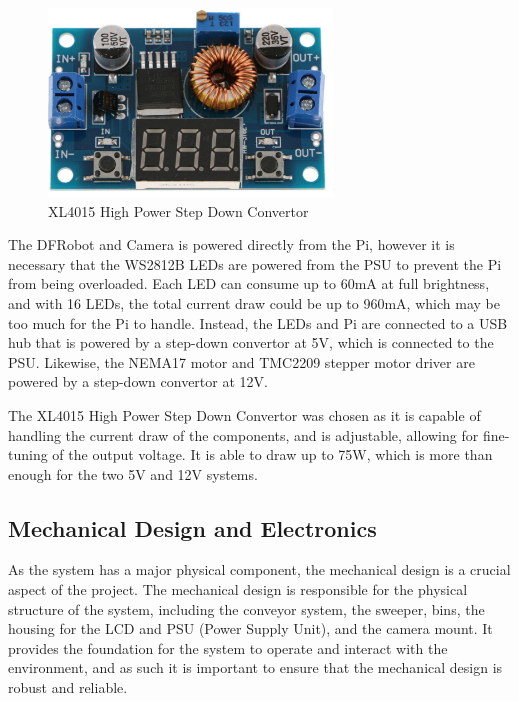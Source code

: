 \begin{figure}[H]
    \begin{minipage}[h]{\textwidth}
        \centering
        \includegraphics[height=5cm]{imgs/parts/stepdownconverter.jpg}
        \caption{XL4015 High Power Step Down Convertor \cite{stepdownconverter}}
    \end{minipage}
\end{figure}

The DFRobot and Camera is powered directly from the Pi, however it is necessary that the WS2812B LEDs are powered from the PSU to prevent the Pi from being overloaded. Each LED can consume up to 60mA at full brightness, and with 16 LEDs, the total current draw could be up to 960mA, which may be too much for the Pi to handle. Instead, the LEDs and Pi are connected to a USB hub that is powered by a step-down convertor at 5V, which is connected to the PSU. Likewise, the NEMA17 motor and TMC2209 stepper motor driver are powered by a step-down convertor at 12V.

The XL4015 High Power Step Down Convertor was chosen as it is capable of handling the current draw of the components, and is adjustable, allowing for fine-tuning of the output voltage. It is able to draw up to 75W, which is more than enough for the two 5V and 12V systems.

\subsection{Mechanical Design and Electronics}
\label{sec:mechanical-design}
As the system has a major physical component, the mechanical design is a crucial aspect of the project. The mechanical design is responsible for the physical structure of the system, including the conveyor system, the sweeper, bins, the housing for the LCD and PSU (Power Supply Unit), and the camera mount. It provides the foundation for the system to operate and interact with the environment, and as such it is important to ensure that the mechanical design is robust and reliable.


